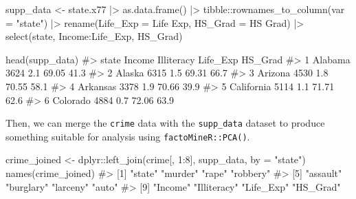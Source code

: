 \documentclass[
  letterpaper,
  10pt,
  krantz2]{krantz}
\makeatletter
\newenvironment{Shaded}{\begin{snugshade}}{\end{snugshade}}
\newcommand{\AttributeTok}[1]{\textcolor[rgb]{0.40,0.45,0.13}{#1}}
\newcommand{\CommentTok}[1]{\textcolor[rgb]{0.37,0.37,0.37}{#1}}
\newcommand{\DecValTok}[1]{\textcolor[rgb]{0.68,0.00,0.00}{#1}}
\newcommand{\FunctionTok}[1]{\textcolor[rgb]{0.28,0.35,0.67}{#1}}
\newcommand{\NormalTok}[1]{\textcolor[rgb]{0.00,0.23,0.31}{#1}}
\newcommand{\OtherTok}[1]{\textcolor[rgb]{0.00,0.23,0.31}{#1}}
\newcommand{\SpecialCharTok}[1]{\textcolor[rgb]{0.37,0.37,0.37}{#1}}
\newcommand{\StringTok}[1]{\textcolor[rgb]{0.13,0.47,0.30}{#1}}
\newenvironment{kframe}{%
  \medskip{}
  \setlength{\fboxsep}{.8em}
  \def\at@end@of@kframe{}%
  \ifinner\ifhmode%
  \def\at@end@of@kframe{\end{minipage}}%
  \begin{minipage}{\columnwidth}%
  \fi\fi%
  \def\FrameCommand##1{\hskip\@totalleftmargin \hskip-\fboxsep
  \colorbox{shadecolor}{##1}\hskip-\fboxsep
      \hskip-\linewidth \hskip-\@totalleftmargin \hskip\columnwidth}%
  \MakeFramed {\advance\hsize-\width
    \@totalleftmargin\z@ \linewidth\hsize
    \@setminipage}}%
{\par\unskip\endMakeFramed%
  \at@end@of@kframe}
\renewenvironment{Shaded}{\begin{kframe}}{\end{kframe}}
\makeatother
\begin{document}
\begin{Shaded}
\begin{Highlighting}[]
\NormalTok{supp\_data }\OtherTok{\textless{}{-}}\NormalTok{ state.x77 }\SpecialCharTok{|\textgreater{}}
  \FunctionTok{as.data.frame}\NormalTok{() }\SpecialCharTok{|\textgreater{}}
\NormalTok{  tibble}\SpecialCharTok{::}\FunctionTok{rownames\_to\_column}\NormalTok{(}\AttributeTok{var =} \StringTok{"state"}\NormalTok{) }\SpecialCharTok{|\textgreater{}}
  \FunctionTok{rename}\NormalTok{(}\AttributeTok{Life\_Exp =} \StringTok{\textasciigrave{}}\AttributeTok{Life Exp}\StringTok{\textasciigrave{}}\NormalTok{,}
         \AttributeTok{HS\_Grad =} \StringTok{\textasciigrave{}}\AttributeTok{HS Grad}\StringTok{\textasciigrave{}}\NormalTok{) }\SpecialCharTok{|\textgreater{}}
  \FunctionTok{select}\NormalTok{(state, Income}\SpecialCharTok{:}\NormalTok{Life\_Exp, HS\_Grad) }

\FunctionTok{head}\NormalTok{(supp\_data)}
\CommentTok{\#\textgreater{}        state Income Illiteracy Life\_Exp HS\_Grad}
\CommentTok{\#\textgreater{} 1    Alabama   3624        2.1    69.05    41.3}
\CommentTok{\#\textgreater{} 2     Alaska   6315        1.5    69.31    66.7}
\CommentTok{\#\textgreater{} 3    Arizona   4530        1.8    70.55    58.1}
\CommentTok{\#\textgreater{} 4   Arkansas   3378        1.9    70.66    39.9}
\CommentTok{\#\textgreater{} 5 California   5114        1.1    71.71    62.6}
\CommentTok{\#\textgreater{} 6   Colorado   4884        0.7    72.06    63.9}
\end{Highlighting}
\end{Shaded}

Then, we can merge the \texttt{crime} data with the \texttt{supp\_data}
dataset to produce something suitable for analysis using
\texttt{factoMineR::PCA()}.

\begin{Shaded}
\begin{Highlighting}[]
\NormalTok{crime\_joined }\OtherTok{\textless{}{-}}
\NormalTok{  dplyr}\SpecialCharTok{::}\FunctionTok{left\_join}\NormalTok{(crime[, }\DecValTok{1}\SpecialCharTok{:}\DecValTok{8}\NormalTok{], supp\_data, }\AttributeTok{by =} \StringTok{"state"}\NormalTok{)}
\FunctionTok{names}\NormalTok{(crime\_joined)}
\CommentTok{\#\textgreater{}  [1] "state"      "murder"     "rape"       "robbery"   }
\CommentTok{\#\textgreater{}  [5] "assault"    "burglary"   "larceny"    "auto"      }
\CommentTok{\#\textgreater{}  [9] "Income"     "Illiteracy" "Life\_Exp"   "HS\_Grad"}
\end{Highlighting}
\end{Shaded}
\end{document}
